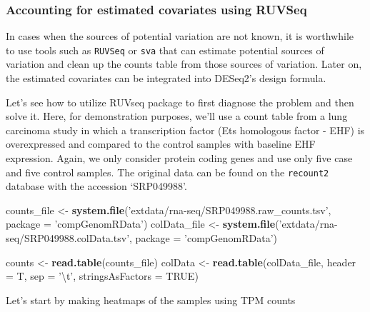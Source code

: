 \documentclass[12pt,]{krantz}
\newenvironment{Shaded}{\begin{snugshade}}{\end{snugshade}}
\newcommand{\CharTok}[1]{\textcolor[rgb]{0.31,0.60,0.02}{#1}}
\newcommand{\DataTypeTok}[1]{\textcolor[rgb]{0.13,0.29,0.53}{#1}}
\newcommand{\KeywordTok}[1]{\textcolor[rgb]{0.13,0.29,0.53}{\textbf{#1}}}
\newcommand{\NormalTok}[1]{#1}
\newcommand{\OtherTok}[1]{\textcolor[rgb]{0.56,0.35,0.01}{#1}}
\newcommand{\StringTok}[1]{\textcolor[rgb]{0.31,0.60,0.02}{#1}}
\begin{document}
\hypertarget{accounting-for-estimated-covariates-using-ruvseq}{%
\subsubsection{Accounting for estimated covariates using RUVSeq}\label{accounting-for-estimated-covariates-using-ruvseq}}

In cases when the sources of potential variation are not known, it is worthwhile to use tools such as \texttt{RUVSeq} or \texttt{sva} that can estimate potential sources of variation and clean up the counts table from those sources of variation. Later on, the estimated covariates can be integrated into DESeq2's design formula.

Let's see how to utilize RUVseq package to first diagnose the problem and then solve it. Here, for demonstration purposes, we'll use a count table from a lung carcinoma study in which a transcription factor (Ets homologous factor - EHF) is overexpressed and compared to the control samples with baseline EHF expression. Again, we only consider protein coding genes and use only five case and five control samples. The original data can be found on the \texttt{recount2} database with the accession `SRP049988'.

\begin{Shaded}
\begin{Highlighting}[]
\NormalTok{counts_file <-}\StringTok{ }\KeywordTok{system.file}\NormalTok{(}\StringTok{'extdata/rna-seq/SRP049988.raw_counts.tsv'}\NormalTok{, }\DataTypeTok{package =} \StringTok{'compGenomRData'}\NormalTok{)}
\NormalTok{colData_file <-}\StringTok{ }\KeywordTok{system.file}\NormalTok{(}\StringTok{'extdata/rna-seq/SRP049988.colData.tsv'}\NormalTok{, }\DataTypeTok{package =} \StringTok{'compGenomRData'}\NormalTok{)}

\NormalTok{counts <-}\StringTok{ }\KeywordTok{read.table}\NormalTok{(counts_file)}
\NormalTok{colData <-}\StringTok{ }\KeywordTok{read.table}\NormalTok{(colData_file, }\DataTypeTok{header =}\NormalTok{ T, }\DataTypeTok{sep =} \StringTok{'}\CharTok{\textbackslash{}t}\StringTok{'}\NormalTok{, }\DataTypeTok{stringsAsFactors =} \OtherTok{TRUE}\NormalTok{)}
\end{Highlighting}
\end{Shaded}

Let's start by making heatmaps of the samples using TPM counts
\end{document}
